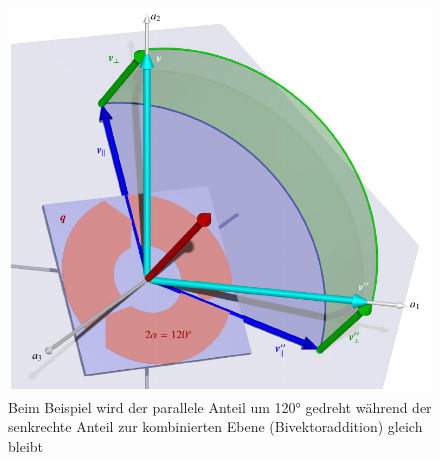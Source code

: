 \begin{figure}
	\centering
	\includegraphics{papers/clifford/3d/drehung.pdf}
	\caption{Beim Beispiel wird der parallele Anteil um 120° gedreht während der senkrechte Anteil zur kombinierten Ebene (Bivektoraddition) gleich bleibt}
	\label{BildQuaternionBeispiel2}
\end{figure}

